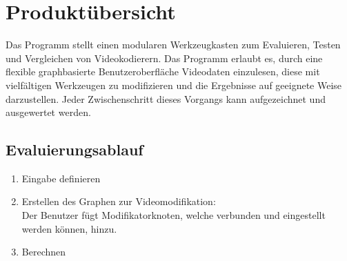 \section{Produktübersicht}

Das Programm stellt einen modularen Werkzeugkasten zum Evaluieren, Testen und Vergleichen von Videokodierern. Das Programm erlaubt es, durch eine flexible graphbasierte Benutzeroberfläche Videodaten einzulesen, diese mit vielfältigen Werkzeugen zu modifizieren und die Ergebnisse auf geeignete Weise darzustellen. Jeder Zwischenschritt dieses Vorgangs kann aufgezeichnet und ausgewertet werden.

\subsection{Evaluierungsablauf}
\begin{enumerate}
	\item Eingabe definieren
	\item Erstellen des Graphen zur Videomodifikation:\\
	Der Benutzer fügt Modifikatorknoten, welche verbunden und eingestellt werden können, hinzu.
	\item Berechnen 
\end{enumerate}